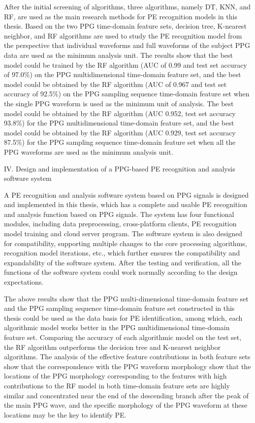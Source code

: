 After the initial screening of algorithms, three algorithms, namely DT, KNN, and RF, are used as the main research methods 
for PE recognition models in this thesis. Based on the two PPG time-domain feature sets, decision tree, K-nearest neighbor, and RF algorithms are 
used to study the PE recognition model from the perspective that individual waveforms and full waveforms of the subject PPG data are used as the minimum analysis unit. 
The results show that the best model could be trained by the RF algorithm (AUC of 0.99 and test set accuracy of 97.0\%) on the PPG multidimensional time-domain 
feature set, and the best model could be obtained by the RF algorithm (AUC of 0.967 and test set accuracy of 92.5\%) on the PPG sampling sequence time-domain 
feature set when the single PPG waveform is used as the minimum unit of analysis. The best model could be obtained by the RF algorithm (AUC 0.952, 
test set accuracy 93.8\%) for the PPG multidimensional time-domain feature set, and the best model could be obtained by the RF algorithm (AUC 0.929, 
test set accuracy 87.5\%) for the PPG sampling sequence time-domain feature set when all the PPG waveforms are used as the minimum analysis unit.

IV. Design and implementation of a PPG-based PE recognition and analysis software system

A PE recognition and analysis software system based on PPG signals is designed and implemented in this thesis, 
which has a complete and usable PE recognition and analysis function based on PPG signals.
The system has four functional modules, including data preprocessing, cross-platform clients, PE recognition model training and cloud server program.
The software system is also designed for compatibility, supporting multiple changes to the core processing algorithms, recognition model iterations, etc., which further ensures the compatibility and expandability of the software system.
After the testing and verification, all the functions of the software system could work normally according to the design expectations.

The above results show that the PPG multi-dimensional time-domain feature set and the PPG sampling sequence time-domain feature set constructed in this thesis 
could be used as the data basis for PE identification, among which, each algorithmic model works better in the PPG multidimensional time-domain feature set.
Comparing the accuracy of each algorithmic model on the test set, the RF algorithm outperforms 
the decision tree and K-nearest neighbor algorithms. The analysis of the effective feature contributions in both feature sets show that the correspondence 
with the PPG waveform morphology show that the locations of the PPG morphology corresponding to the features with high contributions to the RF 
model in both time-domain feature sets are highly similar and concentrated near the end of the descending branch after the peak of the main PPG wave, 
and the specific morphology of the PPG waveform at these locations may be the key to identify PE.

